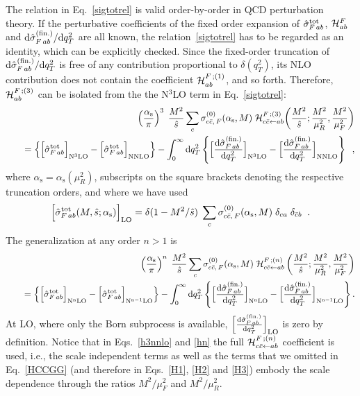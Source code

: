 \documentclass[12pt]{article}
\def\beeq{\begin{eqnarray}}
\def\eeeq{\end{eqnarray}}
\def\nn{\nonumber}
\DeclareRobustCommand{\as}{\ensuremath{\alpha_{\mathrm{s}}}}
\newcommand\f[2]{\frac{#1}{#2}}
\def\ito{\leftarrow}
\DeclareRobustCommand{\qt}{q_T}
\DeclareRobustCommand{\rd}{\ensuremath{\mathrm{d}}}
\begin{document}
The relation in Eq.~\eqref{sigtotrel} is valid order-by-order in QCD perturbation theory. If the perturbative coefficients of the fixed order expansion of ${\hat \sigma}_{F \,ab}^{{\rm {tot}}}$, ${\cal H}_{ab}^F$ and  $\rd{\hat \sigma}_{F \,ab}^{(\rm fin.)}/\rd \qt^2$ are all known, the relation~\eqref{sigtotrel} has to be regarded as an identity, which can be explicitly checked. Since the fixed-order truncation of $ \rd{\hat \sigma}_{F \,ab}^{(\rm fin.)}/{\rd \qt^2}$ is free of any contribution proportional to $\delta(\qt^2)$, its NLO contribution  does not contain the coefficient ${\cal H}_{ab}^{F \,;(1)}$, and so forth. 
Therefore, ${\cal H}_{ab}^{F \,;(3)}$ can be isolated from the 
 the  N$^{3}$LO  term in Eq.~\eqref{sigtotrel}:
\beeq
\label{h3nnlo}
&&\left( \f{\as}{\pi} \right)^3\;\f{M^2}{\hat s} 
\sum_c \sigma_{c{\bar c}, \,F}^{(0)}(\as,M)
\; {\cal H}_{c{\bar c} \ito 
ab}^{F \,;(3)}\!\left(\f{M^2}{\hat s};
\f{M^2}{\mu_R^2},\f{M^2}{\mu_F^2}\right) \nn \\
&& \quad = \left\{
\Bigl[ {\hat \sigma}_{F \,ab}^{{\rm {tot}}} \Bigr]_{\rm N^{3}LO} 
- \Bigl[ {\hat \sigma}_{F \,ab}^{{\rm {tot}}} \Bigr]_{\rm NNLO} 
\right\}
- \int_0^{\infty} \rd\qt^2 
\left\{
\Bigl[ \f{\rd{\hat \sigma}_{F \,ab}^{(\rm fin.)}}{\rd \qt^2} 
\Bigr]_{\rm N^{3}LO} - 
\Bigl[ \f{\rd{\hat \sigma}_{F \,ab}^{(\rm fin.)}}{\rd \qt^2} 
\Bigr]_{\rm NNLO}
\right\}\;\;,
\eeeq
where $\as=\as(\mu_R^2)$, subscripts on the square brackets denoting the respective truncation orders, 
 and where we have used
\begin{equation}
\Bigl[ {\hat \sigma}_{F \,ab}^{{\rm {tot}}}(M,{\hat s};
\as) \Bigr]_{\rm LO} = \delta(1 - M^2/\hat s)
\;\sum_c \sigma_{c{\bar c}, \,F}^{(0)}(\as,M) \;\delta_{ca} 
\;\delta_{{\bar c}b} \;\;.
\end{equation}
The generalization at any order $n > 1$ is~\cite{Bozzi:2005wk}
\beeq
\label{hn}
&&\left( \f{\as}{\pi} \right)^n\;\f{M^2}{\hat s} 
\sum_c \sigma_{c{\bar c}, \,F}^{(0)}(\as,M)
\; {\cal H}_{c{\bar c} \ito 
ab}^{F \,;(n)}\left(\f{M^2}{\hat s};
\f{M^2}{\mu_R^2},\f{M^2}{\mu_F^2}\right) \\
&& \quad = \left\{
\Bigl[ {\hat \sigma}_{F \,ab}^{{\rm {tot}}} \Bigr]_{\rm N^nLO} 
- \Bigl[ {\hat \sigma}_{F \,ab}^{{\rm {tot}}} \Bigr]_{\rm N^{n-1}LO} 
\right\} 
- \int_0^{\infty} \rd\qt^2 
\left\{
\Bigl[ \f{\rd{\hat \sigma}_{F \,ab}^{(\rm fin.)}}{\rd \qt^2} 
\Bigr]_{\rm N^{n}LO} - 
\Bigl[ \f{\rd{\hat \sigma}_{F \,ab}^{(\rm fin.)}}{\rd \qt^2} 
\Bigr]_{\rm N^{n-1}LO}
\right\} . \nn
\eeeq
At LO, where only the Born subprocess is available, $\Bigl[ \f{\rd{\hat \sigma}_{F \,ab}^{(\rm fin.)}}{\rd \qt^2} \Bigr]_{\rm LO}$ is zero by definition. Notice that in Eqs.~\eqref{h3nnlo} and \eqref{hn} the full  ${\cal H}_{c{\bar c} \ito ab}^{F \,;(n)}$ coefficient is used, i.e., the scale independent terms as well as the terms that we omitted in Eq.~\eqref{HCCGG} (and therefore in Eqs.~\eqref{H1}, \eqref{H2} and \eqref{H3}) embody the scale dependence through the ratios $M^{2}/\mu^{2}_{F}$ and $M^{2}/\mu^{2}_{R}$.
\end{document}
